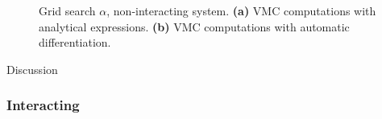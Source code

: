 \begin{figure}[H]
\centering
{}
\qquad
{}
\caption{Grid search $\alpha$, non-interacting system. \textbf{(a)} VMC computations with analytical expressions. \textbf{(b)} VMC computations with automatic differentiation.}
\label{fig:gridsearch}
\end{figure}



Discussion

\subsubsection{Interacting}

